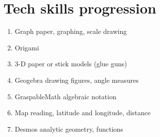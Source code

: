\section*{Tech skills progression}
\begin{enumerate}
  \item Graph paper, graphing, scale drawing
  \item Origami
  \item 3-D paper or stick models (glue guns)
  \item Geogebra drawing figures, angle measures
  \item GraspableMath algebraic notation
  \item Map reading, latitude and longitude, distance
  \item Desmos analytic geometry, functions
\end{enumerate}



